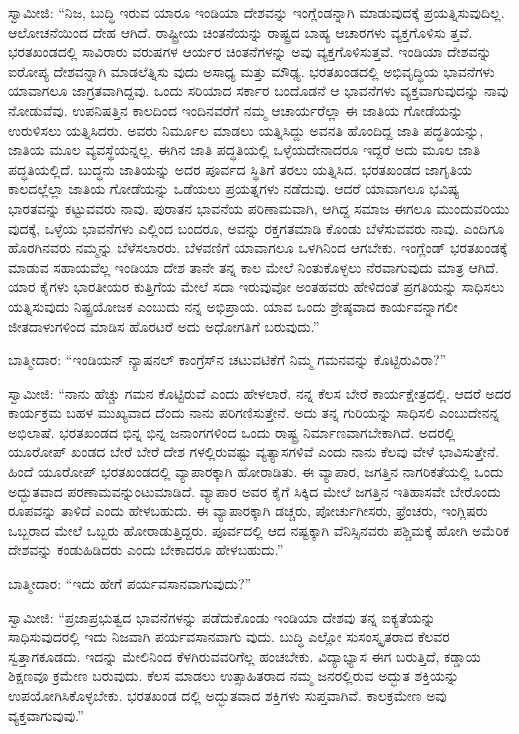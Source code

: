 ಸ್ವಾಮೀಜಿ: “ನಿಜ, ಬುದ್ಧಿ ಇರುವ ಯಾರೂ ಇಂಡಿಯಾ ದೇಶವನ್ನು ಇಂಗ್ಲೆಂಡನ್ನಾಗಿ ಮಾಡುವುದಕ್ಕೆ ಪ್ರಯತ್ನಿಸುವುದಿಲ್ಲ. ಆಲೋಚನೆಯಿಂದ ದೇಹ ಆಗಿದೆ. ರಾಷ್ಟ್ರೀಯ ಚಿಂತನೆಯನ್ನು ರಾಷ್ಟ್ರದ ಬಾಹ್ಯ ಆಚಾರಗಳು ವ್ಯಕ್ತಗೊಳಿಸು ತ್ತವೆ. ಭರತಖಂಡದಲ್ಲಿ ಸಾವಿರಾರು ವರುಷಗಳ ಆರ್ಯರ ಚಿಂತನೆಗಳನ್ನು ಅವು ವ್ಯಕ್ತಗೊಳಿಸುತ್ತವೆ. ಇಂಡಿಯಾ ದೇಶವನ್ನು ಐರೋಪ್ಯ ದೇಶವನ್ನಾಗಿ ಮಾಡಲೆತ್ನಿಸು ವುದು ಅಸಾಧ್ಯ ಮತ್ತು ಮೌಢ್ಯ. ಭರತಖಂಡದಲ್ಲಿ ಅಭಿವೃದ್ಧಿಯ ಭಾವನೆಗಳು ಯಾವಾಗಲೂ ಜಾಗ್ರತವಾಗಿದ್ದವು. ಒಂದು ಸರಿಯಾದ ಸರ್ಕಾರ ಬಂದೊಡನೆ ಆ ಭಾವನೆಗಳು ವ್ಯಕ್ತವಾಗುವುದನ್ನು ನಾವು ನೋಡುವೆವು. ಉಪನಿಷತ್ತಿನ ಕಾಲದಿಂದ ಇಂದಿನವರೆಗೆ ನಮ್ಮ ಆಚಾರ್ಯರೆಲ್ಲಾ ಈ ಜಾತಿಯ ಗೋಡೆಯನ್ನು ಉರುಳಿಸಲು ಯತ್ನಿಸಿದರು. ಅವರು ನಿರ್ಮೂಲ ಮಾಡಲು ಯತ್ನಿಸಿದ್ದು ಅವನತಿ ಹೊಂದಿದ್ದ ಜಾತಿ ಪದ್ಧತಿಯನ್ನು, ಜಾತಿಯ ಮೂಲ ವ್ಯವಸ್ಥೆಯನ್ನಲ್ಲ. ಈಗಿನ ಜಾತಿ ಪದ್ಧತಿಯಲ್ಲಿ ಒಳ್ಳೆಯದೇನಾದರೂ ಇದ್ದರೆ ಅದು ಮೂಲ ಜಾತಿ ಪದ್ಧತಿಯಲ್ಲಿದೆ. ಬುದ್ಧನು ಜಾತಿಯನ್ನು ಅದರ ಪೂರ್ವದ ಸ್ಥಿತಿಗೆ ತರಲು ಯತ್ನಿಸಿದ. ಭರತಖಂಡದ ಜಾಗೃತಿಯ ಕಾಲದಲ್ಲೆಲ್ಲಾ ಜಾತಿಯ ಗೋಡೆಯನ್ನು ಒಡೆಯಲು ಪ್ರಯತ್ನಗಳು ನಡೆದುವು. ಆದರೆ ಯಾವಾಗಲೂ ಭವಿಷ್ಯ ಭಾರತವನ್ನು ಕಟ್ಟುವವರು ನಾವು. ಪುರಾತನ ಭಾವನೆಯ ಪರಿಣಾಮವಾಗಿ, ಆಗಿದ್ದ ಸಮಾಜ ಈಗಲೂ ಮುಂದುವರಿಯು ವುದಕ್ಕೆ, ಒಳ್ಳೆಯ ಭಾವನೆಗಳು ಎಲ್ಲಿಂದ ಬಂದರೂ, ಅವನ್ನು ರಕ್ತಗತಮಾಡಿ ಕೊಂಡು ಬೆಳೆಸುವವರು ನಾವು. ಎಂದಿಗೂ ಹೊರಗಿನವರು ನಮ್ಮನ್ನು ಬೆಳೆಸಲಾರರು. ಬೆಳವಣಿಗೆ ಯಾವಾಗಲೂ ಒಳಗಿನಿಂದ ಆಗಬೇಕು. ಇಂಗ್ಲೆಂಡ್​ ಭರತಖಂಡಕ್ಕೆ ಮಾಡುವ ಸಹಾಯವೆಲ್ಲ ಇಂಡಿಯಾ ದೇಶ ತಾನೇ ತನ್ನ ಕಾಲ ಮೇಲೆ ನಿಂತುಕೊಳ್ಳಲು ನೆರವಾಗುವುದು ಮಾತ್ರ ಆಗಿದೆ. ಯಾರ ಕೈಗಳು ಭಾರತೀಯರ ಕುತ್ತಿಗೆಯ ಮೇಲೆ ಸದಾ ಇರುವುವೋ ಅಂತಹವರು ಹೇಳಿದಂತೆ ಪ್ರಗತಿಯನ್ನು ಸಾಧಿಸಲು ಯತ್ನಿಸುವುದು ನಿಷ್ಪ್ರಯೋಜಕ ಎಂಬುದು ನನ್ನ ಅಭಿಪ್ರಾಯ. ಯಾವ ಒಂದು ಶ್ರೇಷ್ಠವಾದ ಕಾರ್ಯವನ್ನಾಗಲೀ ಜೀತದಾಳುಗಳಿಂದ ಮಾಡಿಸ ಹೊರಟರೆ ಅದು ಅಧೋಗತಿಗೆ ಬರುವುದು.”

ಬಾತ್ಮೀದಾರ: “ಇಂಡಿಯನ್​ ನ್ಯಾಷನಲ್​ ಕಾಂಗ್ರೆಸ್​ನ ಚಟುವಟಿಕೆಗೆ ನಿಮ್ಮ ಗಮನವನ್ನು ಕೊಟ್ಟಿರುವಿರಾ?”

ಸ್ವಾಮೀಜಿ: “ನಾನು ಹೆಚ್ಚು ಗಮನ ಕೊಟ್ಟಿರುವೆ ಎಂದು ಹೇಳಲಾರೆ. ನನ್ನ ಕೆಲಸ ಬೇರೆ ಕಾರ್ಯಕ್ಷೇತ್ರದಲ್ಲಿ. ಆದರೆ ಅದರ ಕಾರ್ಯಕ್ರಮ ಬಹಳ ಮುಖ್ಯವಾದ ದೆಂದು ನಾನು ಪರಿಗಣಿಸುತ್ತೇನೆ. ಅದು ತನ್ನ ಗುರಿಯನ್ನು ಸಾಧಿಸಲಿ ಎಂಬುದೇನನ್ನ ಅಭಿಲಾಷೆ. ಭರತಖಂಡದ ಭಿನ್ನ ಭಿನ್ನ ಜನಾಂಗಗಳಿಂದ ಒಂದು ರಾಷ್ಟ್ರ ನಿರ್ಮಾಣವಾಗಬೇಕಾಗಿದೆ. ಅದರಲ್ಲಿ ಯೂರೋಪ್​ ಖಂಡದ ಬೇರೆ ಬೇರೆ ದೇಶ ಗಳಲ್ಲಿರುವಷ್ಟು ವ್ಯತ್ಯಾಸಗಳಿವೆ ಎಂದು ನಾನು ಕೆಲವು ವೇಳೆ ಭಾವಿಸುತ್ತೇನೆ. ಹಿಂದೆ ಯೂರೋಪ್​ ಭರತಖಂಡದಲ್ಲಿ ವ್ಯಾಪಾರಕ್ಕಾಗಿ ಹೋರಾಡಿತು. ಈ ವ್ಯಾಪಾರ, ಜಗತ್ತಿನ ನಾಗರಿಕತೆಯಲ್ಲಿ ಒಂದು ಅದ್ಭುತವಾದ ಪರಣಾಮವನ್ನುಂಟುಮಾಡಿದೆ. ವ್ಯಾಪಾರ ಅವರ ಕೈಗೆ ಸಿಕ್ಕಿದ ಮೇಲೆ ಜಗತ್ತಿನ ಇತಿಹಾಸವೇ ಬೇರೊಂದು ರೂಪವನ್ನು ತಾಳಿದೆ ಎಂದು ಹೇಳಬಹುದು. ಈ ವ್ಯಾಪಾರಕ್ಕಾಗಿ ಡಚ್ಚರು, ಪೋರ್ಚುಗೀಸರು, ಫ್ರೆಂಚರು, ಇಂಗ್ಲಿಷರು ಒಬ್ಬರಾದ ಮೇಲೆ ಒಬ್ಬರು ಹೋರಾಡುತ್ತಿದ್ದರು. ಪೂರ್ವದಲ್ಲಿ ಆದ ನಷ್ಟಕ್ಕಾಗಿ ವೆನಿಸ್ಸಿನವರು ಪಶ್ಚಿಮಕ್ಕೆ ಹೋಗಿ ಅಮೆರಿಕ ದೇಶವನ್ನು ಕಂಡುಹಿಡಿದರು ಎಂದು ಬೇಕಾದರೂ ಹೇಳಬಹುದು.”

ಬಾತ್ಮೀದಾರ: “ಇದು ಹೇಗೆ ಪರ್ಯವಸಾನವಾಗುವುದು?”

ಸ್ವಾಮೀಜಿ: “ಪ್ರಜಾಪ್ರಭುತ್ವದ ಭಾವನೆಗಳನ್ನು ಪಡೆದುಕೊಂಡು ಇಂಡಿಯಾ ದೇಶವು ತನ್ನ ಐಕ್ಯತೆಯನ್ನು ಸಾಧಿಸುವುದರಲ್ಲಿ ಇದು ನಿಜವಾಗಿ ಪರ್ಯವಸಾನವಾಗು ವುದು. ಬುದ್ಧಿ ಎಲ್ಲೋ ಸುಸಂಸ್ಕೃತರಾದ ಕೆಲವರ ಸ್ವತ್ತಾಗಕೂಡದು. ಇದನ್ನು ಮೇಲಿನಿಂದ ಕೆಳಗಿರುವವರಿಗೆಲ್ಲ ಹಂಚಬೇಕು. ವಿದ್ಯಾಭ್ಯಾಸ ಈಗ ಬರುತ್ತಿದೆ, ಕಡ್ಡಾಯ ಶಿಕ್ಷಣವೂ ಕ್ರಮೇಣ ಬರುವುದು. ಕೆಲಸ ಮಾಡಲು ಉತ್ಸಾಹಿತರಾದ ನಮ್ಮ ಜನರಲ್ಲಿರುವ ಅದ್ಭುತ ಶಕ್ತಿಯನ್ನು ಉಪಯೋಗಿಸಿಕೊಳ್ಳಬೇಕು. ಭರತಖಂಡ ದಲ್ಲಿ ಅದ್ಭುತವಾದ ಶಕ್ತಿಗಳು ಸುಪ್ತವಾಗಿವೆ. ಕಾಲಕ್ರಮೇಣ ಅವು ವ್ಯಕ್ತವಾಗುವುವು.”

